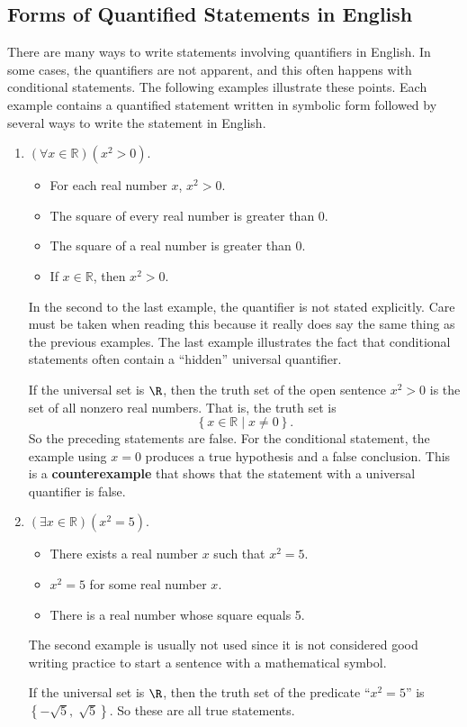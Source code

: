 \subsection*{Forms of Quantified Statements in English}
There are many ways to write statements involving quantifiers in English.  In some cases, the quantifiers are not apparent, and this often happens with conditional statements.  The following examples illustrate these points.  Each example contains a quantified statement written in symbolic form followed by several ways to write the statement in English.
\begin{enumerate}
  \item $\left( {\forall x \in \mathbb{R}} \right)\left( {x^2  > 0} \right)$.
  \begin{itemize}
    \item For each real number  $x$, $x^2  > 0$.
    \item The square of every real number is greater than 0.
    \item The square of a real number is greater than 0.
    \item If  $x \in \mathbb{R}$, then  $x^2  > 0$.
  \end{itemize}
In the second to the last example, the quantifier is not stated explicitly.  Care must be taken when reading this because it really does say the same thing as the previous examples.
The last example illustrates the fact that conditional statements often contain a ``hidden'' universal quantifier.  

If the universal set is  $\R$, then the truth set of the open sentence  $x^2  > 0$ is the set of all nonzero real numbers.  That is, the truth set is
\[
\left\{ {x \in \mathbb{R}} \mid x \ne 0 \right\}.
\]
So the preceding statements are false.  For the conditional statement, the example using  
$x = 0$ produces a true hypothesis and a false conclusion.  This is a \textbf{counterexample}
%
\label{D:counterexample}%
 that shows that the statement with a universal quantifier is false.

\item $\left( {\exists x \in \mathbb{R}} \right)\left( {x^2  = 5} \right)$.
  \begin{itemize}
    \item There exists a real number  $x$  such that  $x^2  = 5$.
    \item $x^2  = 5$ for some real number $x$.
    \item There is a real number whose square equals 5.
  \end{itemize}

The second example is usually not used since it is not considered good writing practice to start a sentence with a mathematical symbol. 

If the universal set is  $\R$, then the truth set of the predicate  ``$x^2  = 5$''  is  
$\left\{ { - \sqrt 5 ,\;\sqrt 5 } \right\}$.  So these are all true statements.
\end{enumerate}
\hbreak

\endinput


